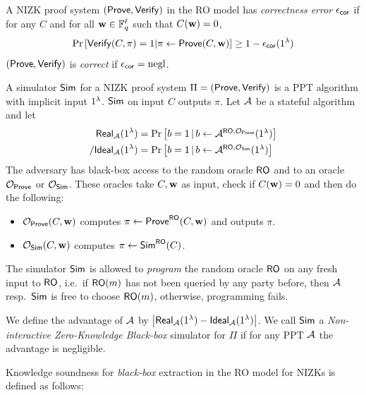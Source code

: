 \begin{definition}[Correctness]
    \label{def:nizk-correctness}
    A NIZK proof system $(\mathsf{Prove}, \mathsf{Verify})$ in the RO model has \emph{correctness error} $\epsilon_{\mathsf{cor}}$
    if for any $C$ and for all $\mathbf{w}\in \mathbb{F}_q^\ell$ such that $C(\mathbf{w})=0$,
    \begin{equation*}
        \Pr\left[
        \mathsf{Verify}( C,\pi) = 1
        \middle |
           \pi\gets \mathsf{Prove}(C,\mathbf{w})
         \right]
        \geq 1 - \epsilon_{\mathsf{cor}}(1^\lambda)
    \end{equation*}
    $( \mathsf{Prove}, \mathsf{Verify})$ is \emph{correct} if $\epsilon_{\mathsf{cor}} = \mathrm{negl}$.
\end{definition}


\begin{definition}\label{def:nizk-zk}
    A simulator $\mathsf{Sim}$ for a NIZK proof system $\Pi = ( \mathsf{Prove}, \mathsf{Verify})$  is a  PPT algorithm  with implicit input $1^\lambda$.
    $\mathsf{Sim}$ on input $C$ outputs $\pi$.
    Let $\mathcal{A}$ be a stateful algorithm and let
    \begin{equation*}
        \begin{aligned}
            \Real_{\adversary}(\SecParam) &= \Pr%
            \begin{bmatrix}
               b=1 \, | \, b \gets \adversary^{\RO, \mathcal{O}_{\Prove}}(\SecParam)
                     \end{bmatrix} \\
/            \Ideal_{\adversary}(\SecParam) &= \Pr%
            \begin{bmatrix}
               b=1 \, | \, b \gets \adversary^{\RO, \mathcal{O}_{\Sim}}(\SecParam)
            \end{bmatrix}
        \end{aligned}
    \end{equation*}
    The adversary has black-box access to the random oracle $\mathsf{RO}$ and to an oracle $\mathcal{O}_{\mathsf{Prove}}$ or $\mathcal{O}_{\mathsf{Sim}}$. These oracles take $C,\mathbf{w}$ as input, check if $C(\mathbf{w})=0$ and then do the following: 
    \begin{itemize}
        \item $\mathcal{O}_{\mathsf{Prove}}(C,\mathbf{w})$ computes $\pi \gets \mathsf{Prove}^{\mathsf{RO}}(C,\mathbf{w})$ and outputs $\pi$.
         \item $\mathcal{O}_{\mathsf{Sim}}(C,\mathbf{w})$ computes $\pi\gets \mathsf{Sim}^{\mathsf{RO}}(C)$.
    \end{itemize}
    The simulator $\mathsf{Sim}$ is allowed to \emph{program} the random oracle $\mathsf{RO}$ on any fresh input to $\mathsf{RO}$,
       i.e.\ if $\mathsf{RO}(m)$ has not been queried by any party before, then $\mathcal{A}$ resp.\ $\mathsf{Sim}$ is free to choose $\mathsf{RO}(m)$, otherwise, programming fails. 
       
    We define the advantage of $\mathcal{A}$ by $ \left|\mathsf{Real}_{\mathcal{A}}(1^\lambda) - \mathsf{Ideal}_{\mathcal{A}}(1^\lambda)\right|$.
    We call $\mathsf{Sim}$ a \emph{Non-interactive Zero-Knowledge Black-box} simulator for $\Pi$
    if for any PPT $\mathcal{A}$ the advantage is negligible.
\end{definition}
Knowledge soundness for \emph{black-box} extraction in the  RO model for NIZKs is defined as follows:


